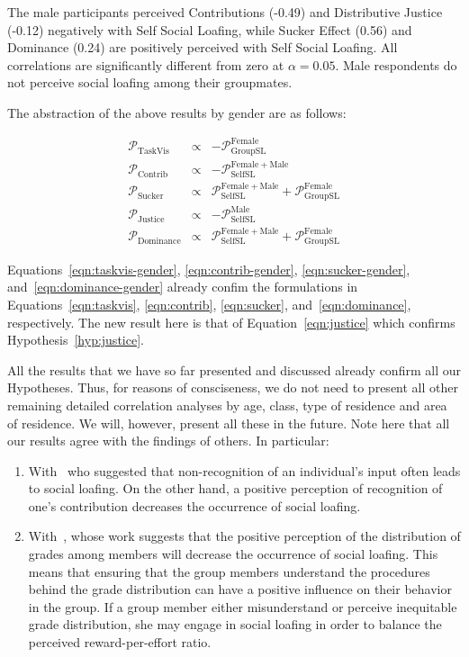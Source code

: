 \documentclass[a4paper,a4paper,BCOR12mm,12pt,abstracton,pointednumbers,tablecaptionabove,footinclude,halfparskip,normalheadings,]{scrartcl}
\newcommand{\PERCEPT}{\mathcal{P}}
\newcommand{\SELFSL}{\mathrm{SelfSL}}
\newcommand{\GROUPSL}{\mathrm{GroupSL}}
\newcommand{\TASKVIS}{\mathrm{TaskVis}}
\newcommand{\JUSTICE}{\mathrm{Justice}}
\newcommand{\CONTRIB}{\mathrm{Contrib}}
\newcommand{\DOMINANCE}{\mathrm{Dominance}}
\newcommand{\SUCKER}{\mathrm{Sucker}}
\newcommand{\FEMALE}{\mathrm{Female}}
\newcommand{\MALE}{\mathrm{Male}}
\begin{document}
The male participants perceived Contributions (-0.49) and Distributive Justice (-0.12) negatively with Self Social Loafing, while Sucker Effect (0.56) and Dominance (0.24) are positively perceived with Self Social Loafing. All correlations are significantly different from zero at $\alpha=0.05$. Male respondents do not perceive social loafing among their groupmates.

The abstraction of the above results by gender are as follows:

\begin{eqnarray}
 \PERCEPT_\TASKVIS & \propto & -\PERCEPT_\GROUPSL^\FEMALE\\\label{eqn:taskvis-gender}
 \PERCEPT_\CONTRIB & \propto & -\PERCEPT_\SELFSL^{\FEMALE+\MALE}\\\label{eqn:contrib-gender}
 \PERCEPT_\SUCKER  & \propto & \PERCEPT_\SELFSL^{\FEMALE+\MALE} + \PERCEPT_\GROUPSL^\FEMALE\\\label{eqn:sucker-gender}
 \PERCEPT_\JUSTICE & \propto & -\PERCEPT_\SELFSL^\MALE\\\label{eqn:justice}
 \PERCEPT_\DOMINANCE & \propto & \PERCEPT_\SELFSL^{\FEMALE+\MALE} + \PERCEPT_\GROUPSL^\FEMALE\label{eqn:dominance-gender}
\end{eqnarray}

Equations~\ref{eqn:taskvis-gender}, \ref{eqn:contrib-gender}, \ref{eqn:sucker-gender}, and~\ref{eqn:dominance-gender} already confim the formulations in Equations~\ref{eqn:taskvis}, \ref{eqn:contrib}, \ref{eqn:sucker}, and~\ref{eqn:dominance}, respectively. The new result here is that of Equation~\ref{eqn:justice} which confirms Hypothesis~\ref{hyp:justice}.

All the results that we have so far presented and discussed already confirm all our Hypotheses. Thus, for reasons of consciseness, we do not need to present all other remaining detailed correlation analyses by age, class, type of residence and area of residence. We will, however, present all these in the future. Note here that all our results agree with the findings of others. In particular:
\begin{enumerate}
\item With~\citet{Liden04} who suggested that non-recognition of an individual's input often leads to social loafing. On the other hand, a positive perception of recognition of one's contribution decreases the occurrence of social loafing. 
\item With~\citet{Liden04}, whose work suggests that the positive perception of the distribution of grades among members will decrease the occurrence of social loafing. This means that ensuring that the group members understand the procedures behind the grade distribution can have a positive influence on their behavior in the group. If a group member either misunderstand or perceive inequitable grade distribution, she may engage in social loafing in order to balance the perceived reward-per-effort ratio. 
\end{enumerate}
\end{document}
